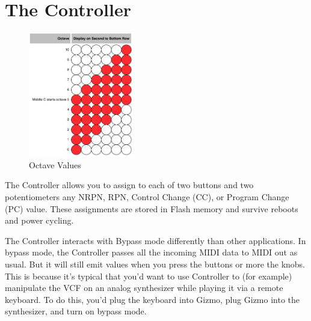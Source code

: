 \documentclass{article}
\begin{document}
\section {The Controller}
\label{controller}

\begin{figure}
\vspace{-11em}\includegraphics[width=1.8in]{octave.pdf}
\vspace{-2em}\caption{\small Octave Values}\vspace{-1em}
\label{octave}
\end{figure}

The Controller allows you to assign to each of two buttons and two potentiometers any NRPN, RPN, Control Change (CC), or Program Change (PC) value.  These assignments are stored in Flash memory and survive reboots and power cycling.

The Controller interacts with Bypass mode differently than other applications.  In bypass mode, the Controller passes all the incoming MIDI data to MIDI out as usual.  But it will still emit values when you press the buttons or more the knobs.  This is because it's typical that you'd want to use Controller to (for example) manipulate the VCF on an analog synthesizer while playing it via a remote keyboard.  To do this, you'd plug the keyboard into Gizmo, plug Gizmo into the synthesizer, and turn on bypass mode.
\end{document}
